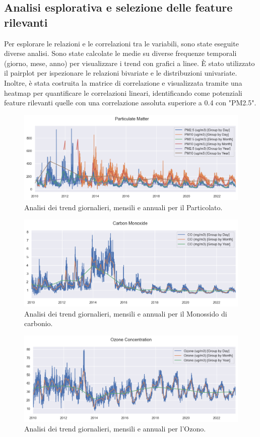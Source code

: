 \documentclass[a4paper,12pt]{report}
\begin{document}
	\subsection{Analisi esplorativa e selezione delle feature rilevanti}
	Per esplorare le relazioni e le correlazioni tra le variabili, sono state eseguite diverse analisi. Sono state calcolate le medie su diverse frequenze temporali (giorno, mese, anno) per visualizzare i trend con grafici a linee. È stato utilizzato il pairplot per ispezionare le relazioni bivariate e le distribuzioni univariate. Inoltre, è stata costruita la matrice di correlazione e visualizzata tramite una heatmap per quantificare le correlazioni lineari, identificando come potenziali feature rilevanti quelle con una correlazione assoluta superiore a 0.4 con "PM2.5".
	
	\begin{figure}[H]
		\centering
		\includegraphics[width=1.0\textwidth]{img/pm_trend_pm.png}
		\caption{Analisi dei trend giornalieri, mensili e annuali per il Particolato.}
	\end{figure}
	\begin{figure}[H]
		\centering
		\includegraphics[width=1.0\textwidth]{img/carbon_trend_pm.png}
		\caption{Analisi dei trend giornalieri, mensili e annuali per il Monossido di carbonio.}
	\end{figure}
	\begin{figure}[H]
		\centering
		\includegraphics[width=1.0\textwidth]{img/ozone_trend_pm.png}
		\caption{Analisi dei trend giornalieri, mensili e annuali per l'Ozono.}
	\end{figure}
\end{document}
